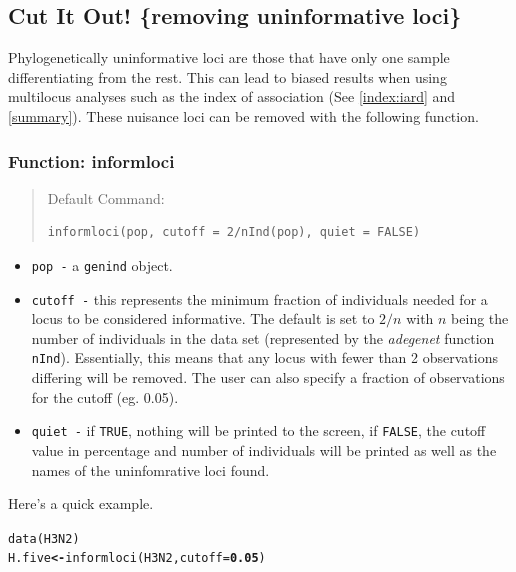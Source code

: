 \documentclass[letterpaper]{article}\usepackage[]{graphicx}\usepackage[]{color}
\makeatletter
\newcommand{\hlnum}[1]{\textcolor[rgb]{0.502,0,0.502}{\textbf{#1}}}%
\newcommand{\hlstd}[1]{\textcolor[rgb]{0,0,0}{#1}}%
\newcommand{\hlkwb}[1]{\textcolor[rgb]{0.502,0.502,0.753}{\textbf{#1}}}%
\newcommand{\hlkwc}[1]{\textcolor[rgb]{0,0.502,0.753}{#1}}%
\newcommand{\hlkwd}[1]{\textcolor[rgb]{0,0.267,0.4}{#1}}%
\newenvironment{kframe}{%
 \def\at@end@of@kframe{}%
 \ifinner\ifhmode%
  \def\at@end@of@kframe{\end{minipage}}%
  \begin{minipage}{\columnwidth}%
 \fi\fi%
 \def\FrameCommand##1{\hskip\@totalleftmargin \hskip-\fboxsep
 \colorbox{shadecolor}{##1}\hskip-\fboxsep
     \hskip-\linewidth \hskip-\@totalleftmargin \hskip\columnwidth}%
 \MakeFramed {\advance\hsize-\width
   \@totalleftmargin\z@ \linewidth\hsize
   \@setminipage}}%
 {\par\unskip\endMakeFramed%
 \at@end@of@kframe}
\newenvironment{knitrout}{}{} %
\newcommand{\tab}{\hspace*{1em}}
\makeatother
\begin{document}
\subsection{Cut It Out!  \{removing uninformative loci\}}\label{data.manip:informloci}
 \tab\tab Phylogenetically uninformative loci are those that have only one sample differentiating from the rest. This can lead to biased results when using multilocus analyses such as the index of association (See \ref{index:iard} and \ref{summary}). These nuisance loci can be removed with the following function.
\subsubsection{Function: informloci}\label{data.manip:informloci:informloci}
\begin{quote}
Default Command:
\begin{knitrout}
\color{fgcolor}\begin{kframe}
\begin{verbatim}
informloci(pop, cutoff = 2/nInd(pop), quiet = FALSE)
\end{verbatim}
\end{kframe}
\end{knitrout}

\end{quote}
  \begin{itemize}
    \item \texttt{pop -} a \texttt{genind} object.
    \item \texttt{cutoff -} this represents the minimum fraction of individuals needed for a locus to be considered informative. The default is set to $2/n$ with $n$ being the number of individuals in the data set (represented by the \textit{adegenet} function \texttt{nInd}). Essentially, this means that any locus with fewer than 2 observations differing will be removed. The user can also specify a fraction of observations for the cutoff (eg. 0.05).
    \item \texttt{quiet -} if \texttt{TRUE}, nothing will be printed to the screen, if \texttt{FALSE}, the cutoff value in percentage and number of individuals will be printed as well as the names of the uninfomrative loci found. 
  \end{itemize}

Here's a quick example.
\begin{knitrout}\footnotesize
{}\color{fgcolor}\begin{kframe}
\begin{alltt}
\hlkwd{data}\hlstd{(H3N2)}
\hlstd{H.five} \hlkwb{<-} \hlkwd{informloci}\hlstd{(H3N2,} \hlkwc{cutoff} \hlstd{=} \hlnum{0.05}\hlstd{)}
\end{alltt}
\end{kframe}
\end{knitrout}
\end{document}
